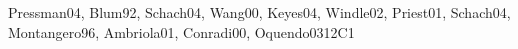 \begin{syllabus}
\begin{competences}
    \item {} 
    \item {}
    \item {}
    \item {}
    \item {}
    \item {}
    \item {}
    \item {}
    \item {}
    \item {}
\end{competences}

\begin{unit}{\SEToolsandEnvironments}{}{Pressman04, Blum92, Schach04, Wang00, Keyes04, Windle02, Priest01, Schach04, Montangero96, Ambriola01, Conradi00, Oquendo03}{12}{C1}
\begin{topics}%
    \item \SEToolsandEnvironmentsTopicSoftware
    \item \SEToolsandEnvironmentsTopicRelease
    \item \SEToolsandEnvironmentsTopicRequierements
    \item \SEToolsandEnvironmentsTopicTesting
    \item \SEToolsandEnvironmentsTopicProgramming
    \item \SEToolsandEnvironmentsTopicTool
\end{topics}
\begin{learningoutcomes}
    \item \SEToolsandEnvironmentsTopicSoftware[\Usage]
    \item \SEToolsandEnvironmentsTopicRelease[\Usage]
    \item \SEToolsandEnvironmentsTopicRequierements[\Usage]
    \item \SEToolsandEnvironmentsTopicTesting[\Usage]
    \item \SEToolsandEnvironmentsTopicProgramming[\Usage]
    \item \SEToolsandEnvironmentsTopicTool[\Usage]
\end{learningoutcomes}
\end{unit}


\end{syllabus}
